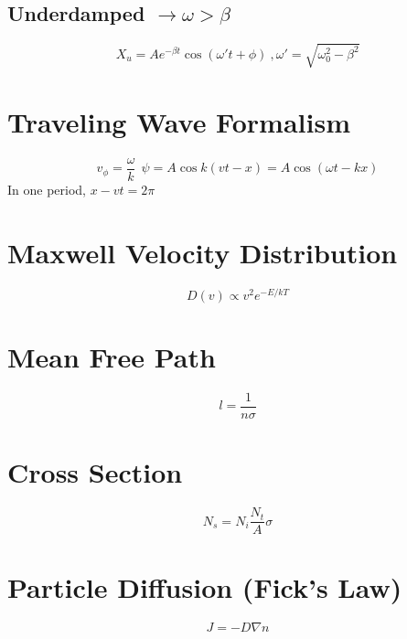 \documentclass[10pt,letter]{article}
\begin{document}
\subsection{Underdamped $\rightarrow \omega > \beta$} %
\label{sub:underdamped_}
\begin{equation}
    X_u = Ae^{-\beta t}\cos(\omega't + \phi)~,\omega' = \sqrt{\omega_0^2 - \beta^2}
\end{equation}

\section{Traveling Wave Formalism} %
\label{sec:traveling_wave_formalism}
\begin{equation}
    v_\phi = \frac{\omega}{k}~~ \psi = A\cos k (vt-x) = A\cos (\omega t- kx)
\end{equation}
In one period, $x-vt=2\pi$

\section{Maxwell Velocity Distribution} %
\label{sec:maxwell_velocity_distribution}
\begin{equation}
    D(v) \propto v^2 e^{-E/kT}
\end{equation}

\section{Mean Free Path} %
\label{sec:mean_free_path}
\begin{equation}
    l = \frac{1}{n\sigma}
\end{equation}

\section{Cross Section} %
\label{sec:cross_section}
\begin{equation}
    N_s = N_i \frac{N_t}{A} \sigma
\end{equation}

\section{Particle Diffusion (Fick's Law)} %
\label{sec:particle_diffusion}
\begin{equation}
    J = - D \nabla n
\end{equation}
\end{document}
